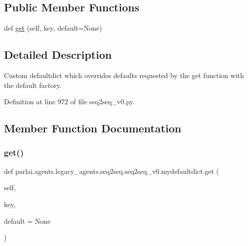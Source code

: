 \subsection*{Public Member Functions}
\begin{DoxyCompactItemize}
\item 
def \hyperlink{classparlai_1_1agents_1_1legacy__agents_1_1seq2seq_1_1seq2seq__v0_1_1mydefaultdict_a189be974031427bf68e4691307e2f2c2}{get} (self, key, default=None)
\end{DoxyCompactItemize}


\subsection{Detailed Description}
\begin{DoxyVerb}Custom defaultdict which overrides defaults requested by the get function with the
default factory.
\end{DoxyVerb}
 

Definition at line 972 of file seq2seq\+\_\+v0.\+py.



\subsection{Member Function Documentation}
\mbox{\label{classparlai_1_1agents_1_1legacy__agents_1_1seq2seq_1_1seq2seq__v0_1_1mydefaultdict_a189be974031427bf68e4691307e2f2c2}} 
\subsubsection{\texorpdfstring{get()}{get()}}
{\footnotesize\ttfamily def parlai.\+agents.\+legacy\+\_\+agents.\+seq2seq.\+seq2seq\+\_\+v0.\+mydefaultdict.\+get (\begin{DoxyParamCaption}\item[{}]{self,  }\item[{}]{key,  }\item[{}]{default = {\ttfamily None} }\end{DoxyParamCaption})}




